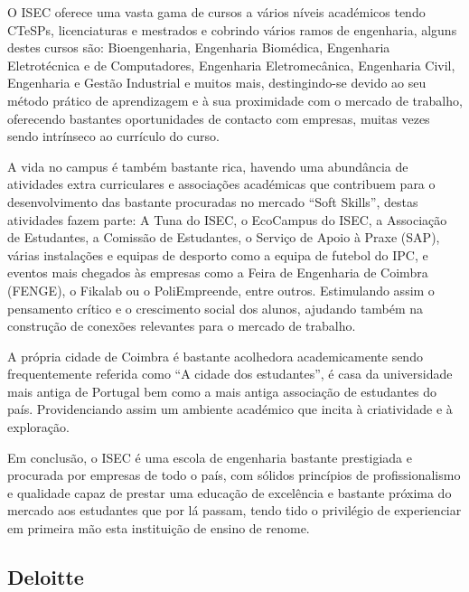         O ISEC oferece uma vasta gama de cursos a vários níveis académicos tendo CTeSPs, licenciaturas e mestrados e cobrindo vários ramos de engenharia, alguns destes cursos são: Bioengenharia, Engenharia Biomédica, Engenharia Eletrotécnica e de Computadores, Engenharia Eletromecânica, Engenharia Civil, Engenharia e Gestão Industrial e muitos mais, destingindo-se devido ao seu método prático de aprendizagem e à sua proximidade com o mercado de trabalho, oferecendo bastantes oportunidades de contacto com empresas, muitas vezes sendo intrínseco ao currículo do curso.
    
        A vida no campus é também bastante rica, havendo uma abundância de atividades extra curriculares e associações académicas que contribuem para o desenvolvimento das bastante procuradas no mercado ``Soft Skills'', destas atividades fazem parte: A Tuna do ISEC, o EcoCampus do ISEC, a Associação de Estudantes, a Comissão de Estudantes, o Serviço de Apoio à Praxe (SAP), várias instalações e equipas de desporto como a equipa de futebol do IPC, e eventos mais chegados às empresas como a Feira de Engenharia de Coimbra (FENGE), o Fikalab ou o PoliEmpreende, entre outros. Estimulando assim o pensamento crítico e o crescimento social dos alunos, ajudando também na construção de conexões relevantes para o mercado de trabalho.
    
        A própria cidade de Coimbra é bastante acolhedora academicamente sendo frequentemente referida como ``A cidade dos estudantes'', é casa da universidade mais antiga de Portugal\cite{universidade-coimbra} bem como a mais antiga associação de estudantes do país\cite{wiki-associacao}. Providenciando assim um ambiente académico que incita à criatividade e à exploração.
    
        Em conclusão, o ISEC é uma escola de engenharia bastante prestigiada e procurada por empresas de todo o país, com sólidos princípios de profissionalismo e qualidade capaz de prestar uma educação de excelência e bastante próxima do mercado aos estudantes que por lá passam, tendo tido o privilégio de experienciar em primeira mão esta instituição de ensino de renome.
    
    
    \subsection{Deloitte}\label{subsec:deloitte}

    
